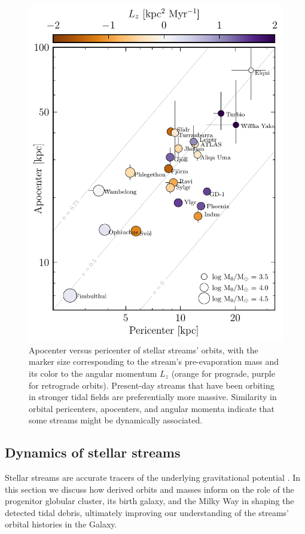 \documentclass[twocolumn]{aastex63}
\begin{document}
\begin{figure}
\includegraphics[width=\hsize]{figures/streams_peri_apo.pdf}
\caption{
Apocenter versus pericenter of stellar streams' orbits, with the marker size corresponding to the stream's pre-evaporation mass and its color to the angular momentum $L_z$ (orange for prograde, purple for retrograde orbits).
Present-day streams that have been orbiting in stronger tidal fields are preferentially more massive.
Similarity in orbital pericenters, apocenters, and angular momenta indicate that some streams might be dynamically associated.
}
\label{fig:individual_summary}
\end{figure}


\subsection{Dynamics of stellar streams}
\label{sec:discuss_dynamics}
Stellar streams are accurate tracers of the underlying gravitational potential \citep{bh:2018}.
In this section we discuss how derived orbits and masses inform on the role of the progenitor globular cluster, its birth galaxy, and the Milky Way in shaping the detected tidal debris, ultimately improving our understanding of the streams' orbital histories in the Galaxy.
\end{document}
